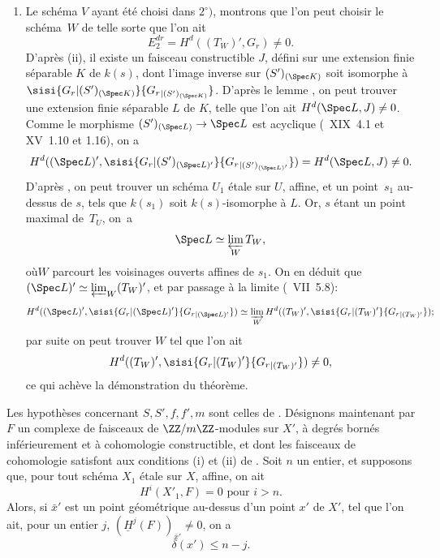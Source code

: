\begin{enumerate}
\item[$3^\circ)$]
Le sch\'ema $V$ ayant \'et\'e choisi dans $2^\circ)$, montrons que l'on peut choisir le sch\'ema~$W$ de telle sorte que l'on ait
$$
E^{dr}_2 = H^d((T_W)', G_r) \neq 0.
$$
D'apr\`es \textup{(ii)}, il existe un faisceau constructible $J$, d\'efini sur une extension finie s\'eparable $K$ de $k(s)$, dont l'image inverse sur $(S')_{(\Spec K)}$ soit isomorphe \`a $\sisi{{G_r}{|(S')_{(\Spec K)}}}{{G_r}_{|(S')_{(\Spec K)}}}$. D'apr\`es le lemme , on peut trouver une extension finie s\'eparable $L$ de $K$, telle que l'on ait $H^d(\Spec L, J) \neq 0$. Comme le morphisme $(S')_{(\Spec L)} \to \Spec L$ est acyclique (~XIX~4.1 et XV~1.10 et 1.16), on a
$$
H^d((\Spec L)', \sisi{{G_r}{|(S')_{(\Spec L)'}}}{{G_r}_{|(S')_{(\Spec L)'}}}) = H^d(\Spec L, J) \neq 0.
$$
D'apr\`es , on peut trouver un sch\'ema $U_1$ \'etale sur $U$, affine, et un point~$s_1$ au-dessus de $s$, tels que $k(s_1)$ soit $k(s)$-isomorphe \`a $L$. Or, $s$ \'etant un point maximal de~$T_U$, on~a
$$
\Spec L \simeq \varprojlim_W T_W,
$$
o\`u\pageoriginaled $W$ parcourt les voisinages ouverts affines de $s_1$. On en d\'eduit que $(\Spec L)' \simeq \varprojlim_W(T_W)'$, et par passage \`a la limite (~VII~5.8):
$$
H^d((\Spec L)', \sisi{{G_r}{|(\Spec L)'}}{{G_r}_{|(\Spec L)'}}) \simeq \varinjlim_W H^d((T_W)', \sisi{{G_r}{|(T_W)'}}{{G_r}_{|(T_W)'}});
$$
par suite on peut trouver $W$ tel que l'on ait
$$
H^d((T_W)', \sisi{{G_r}{|(T_W)'}}{{G_r}_{|(T_W)'}})\neq 0,
$$
ce qui ach\`eve la d\'emonstration du th\'eor\`eme.
\end{enumerate}

\begin{corollaire} \label{XIV.3.6}
Les hypoth\`eses concernant $S, S', f, f', m$ sont celles de . D\'esignons maintenant par $F$ un complexe de faisceaux de $\ZZ/m\ZZ$-modules sur $X'$, \`a degr\'es born\'es inf\'erieurement et \`a cohomologie constructible, et dont les faisceaux de cohomologie satisfont aux conditions \textup{(i)} et \textup{(ii)} de . Soit $n$ un entier, et supposons que, pour tout sch\'ema $X_1$ \'etale sur $X$, affine, on ait
$$
H^i(X'_1, F)=0\text{ pour } i>n.
$$
Alors, si $\bar{x}'$ est un point g\'eom\'etrique au-dessus d'un point $x'$ de $X'$, tel que l'on ait, pour un entier $j$, $(\underline{H}^j(F))_{\bar{x}'} \neq 0$, on a
$$
\delta(x')\leq n-j.
$$
\end{corollaire}


